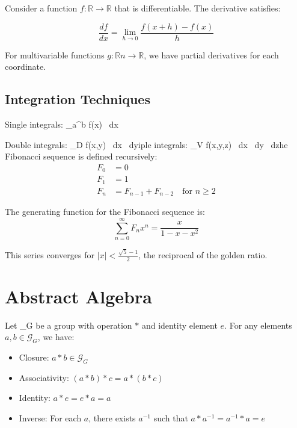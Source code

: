 \documentclass{article}
\newcommand{\abs}[1]{|#1|}
\newcommand{\real}{\mathbb{R}}
\newcommand{\group}[1]{\mathcal{G}_{#1}}
\newcommand{\derivative}[2]{\frac{d#1}{d#2}}
\newcommand{\partialderivative}[2]{\frac{\partial #1}{\partial #2}}
\newcommand{\integral}[4]{\int_{#1}^{#2} #3 \, d#4}
\newcommand{\doubleintegral}[6]{\iint_{#1} #2 \, d#3 \, d#4}
\newcommand{\tripleintegral}[8]{\iiint_{#1} #2 \, d#3 \, d#4 \, d#5}
\newcommand{\limit}[3]{\lim_{#1 \to #2} #3}
\newcommand{\series}[3]{\sum_{#1}^{#2} #3}
\begin{document}
Consider a function \(f: \real{} \to \real{}\) that is differentiable. The derivative \derivative{f}{x} satisfies:

\[\derivative{f}{x} = \limit{h}{0}{\frac{f(x+h) - f(x)}{h}}\]

For multivariable functions \(g: \real{n} \to \real{}\), we have partial derivatives \partialderivative{g}{x_i} for each coordinate.

\subsection{Integration Techniques}

Single integrals: \integral{a}{b}{f(x)}{x}

Double integrals: \doubleintegral{D}{f(x,y)}{x}{y}

Triple integrals: \tripleintegral{V}{f(x,y,z)}{x}{y}{z}

\section{Sequences and Series}

The Fibonacci sequence is defined recursively:
\begin{align}
F_0 &= 0 \\
F_1 &= 1 \\
F_n &= F_{n-1} + F_{n-2} \quad \text{for } n \geq 2
\end{align}

The generating function for the Fibonacci sequence is:
\[\series{n=0}{\infty}{F_n x^n} = \frac{x}{1 - x - x^2}\]

This series converges for \(\abs{x} < \frac{\sqrt{5} - 1}{2}\), the reciprocal of the golden ratio.

\section{Abstract Algebra}

Let \group{G} be a group with operation \(*\) and identity element \(e\). For any elements \(a, b \in \group{G}\), we have:
\begin{itemize}
\item Closure: \(a * b \in \group{G}\)
\item Associativity: \((a * b) * c = a * (b * c)\)
\item Identity: \(a * e = e * a = a\)
\item Inverse: For each \(a\), there exists \(a^{-1}\) such that \(a * a^{-1} = a^{-1} * a = e\)
\end{itemize}
\end{document}
